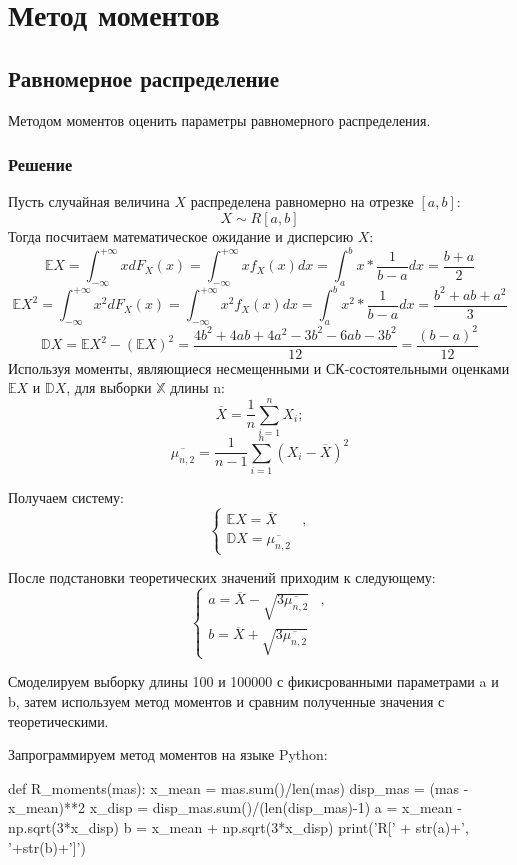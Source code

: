 \documentclass{article}
\begin{document}
	
\section{Метод моментов}
\subsection{Равномерное распределение}
Методом моментов оценить параметры равномерного распределения. 
\subsubsection{Решение}
Пусть случайная величина $X$ распределена равномерно на отрезке $[a, b]$:
\[X \sim R[a, b]\]
Тогда посчитаем математическое ожидание и дисперсию $X$:
\[\mathbb{E}X = \int_{-\infty}^{+\infty}xdF_X(x) = \int_{-\infty}^{+\infty}xf_X(x)dx = \int_{a}^{b}x*\frac{1}{b-a}dx = \frac{b+a}{2}\]
\[\mathbb{E}X^2 = \int_{-\infty}^{+\infty}x^2dF_X(x) = \int_{-\infty}^{+\infty}x^2f_X(x)dx = \int_{a}^{b}x^2*\frac{1}{b-a}dx = \frac{b^2+ab+a^2}{3}\]
\[\mathbb{D}X = \mathbb{E}X^2 - (\mathbb{E}X)^2 = \frac{4b^2+4ab+4a^2 - 3b^2 - 6ab - 3b^2}{12} = \frac{(b-a)^2}{12}\]
Используя моменты, являющиеся несмещенными и СК-состоятельными оценками $\mathbb{E}X$ и $\mathbb{D}X$, для выборки $\mathbb{X}$ длины n:
\[\overline{X} = \frac{1}{n}\sum_{i = 1}^{n}X_i;\]
\[\overline{\mu_{n,2}} = \frac{1}{n-1}\sum_{i = 1}^{n}(X_i - \overline{X})^2\]

Получаем систему:
\begin{equation*}
\begin{cases}
	\mathbb{E}X = \overline{X} &,\\
	\mathbb{D}X = \overline{\mu_{n, 2}}
\end{cases}
\end{equation*}

После подстановки теоретических значений приходим к следующему:
\begin{equation*}
	\begin{cases}
		a = \overline{X} - \sqrt{3\overline{\mu_{n, 2}}} &,\\
		b = \overline{X} + \sqrt{3\overline{\mu_{n, 2}}}
	\end{cases}
\end{equation*}

Смоделируем выборку длины 100 и 100000 с фикисрованными параметрами a и b, затем используем метод моментов и сравним полученные значения с теоретическими.

Запрограммируем метод моментов на языке Python:
\begin{python}
def R_moments(mas):
	x_mean = mas.sum()/len(mas)
	disp_mas = (mas - x_mean)**2
	x_disp = disp_mas.sum()/(len(disp_mas)-1)
	a = x_mean - np.sqrt(3*x_disp)
	b = x_mean + np.sqrt(3*x_disp)
	print('R[' + str(a)+', '+str(b)+']')
\end{python}
\end{document}
